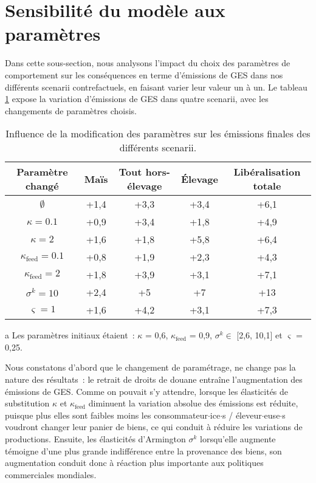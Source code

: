 \section{Sensibilité du modèle aux paramètres}

Dans cette sous-section, nous analysons l'impact du choix des paramètres de comportement sur les conséquences en terme d'émissions de GES dans nos différents scenarii contrefactuels, en faisant varier leur valeur un à un. Le tableau \ref{tab:sensibilite_param} expose la variation d'émissions de GES dans quatre scenarii, avec les changements de paramètres choisis.

\begin{table}[hbt!]
    \centering
    \caption{Influence de la modification des paramètres sur les émissions finales des différents scenarii.}
    \label{tab:sensibilite_param}
    \begin{tabular}{c|cccc}
        \hline
        Paramètre changé           & Maïs & Tout hors-élevage & Élevage & Libéralisation totale \\ \hline
        $\emptyset$\tnote{a}       & +1,4 & +3,3              & +3,4    & +6,1                  \\
        $\kappa = 0.1$             & +0,9 & +3,4              & +1,8    & +4,9                  \\
        $\kappa = 2$               & +1,6 & +1,8              & +5,8    & +6,4                  \\
        $\kappa_\text{feed} = 0.1$ & +0,8 & +1,9              & +2,3    & +4,3                  \\
        $\kappa_\text{feed} = 2$   & +1,8 & +3,9              & +3,1    & +7,1                  \\
        $\sigma^k = 10$            & +2,4 & +5                & +7      & +13                   \\
        $\varsigma = 1$            & +1,6 & +4,2              & +3,1    & +7,3                  \\
        \hline
    \end{tabular}%
    \begin{tablenotes}
        \footnotesize
        \item[a] Les paramètres initiaux étaient~: $\kappa$ = 0,6, $\kappa_\text{feed}$ = 0,9, $\sigma^k \in$ [2,6, 10,1] et $\varsigma$ = 0,25.
    \end{tablenotes}
\end{table}

Nous constatons d'abord que le changement de paramétrage, ne change pas la nature des résultats~: le retrait de droits de douane entraîne l'augmentation des émissions de GES. Comme on pouvait s'y attendre, lorsque les élasticités de substitution $\kappa$ et $\kappa_\text{feed}$ diminuent la variation absolue des émissions est réduite, puisque plus elles sont faibles moins les consommateur$\cdot$ice$\cdot$s / éleveur$\cdot$euse$\cdot$s voudront changer leur panier de biens, ce qui conduit à réduire les variations de productions. Ensuite, les élasticités d'Armington $\sigma^k$ lorsqu'elle augmente témoigne d'une plus grande indifférence entre la provenance des biens, son augmentation conduit donc à réaction plus importante aux politiques commerciales mondiales.